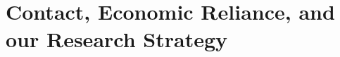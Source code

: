 \chapter{Contact, Economic Reliance, and our Research Strategy \label{cha:meth}}


\doublespacing




